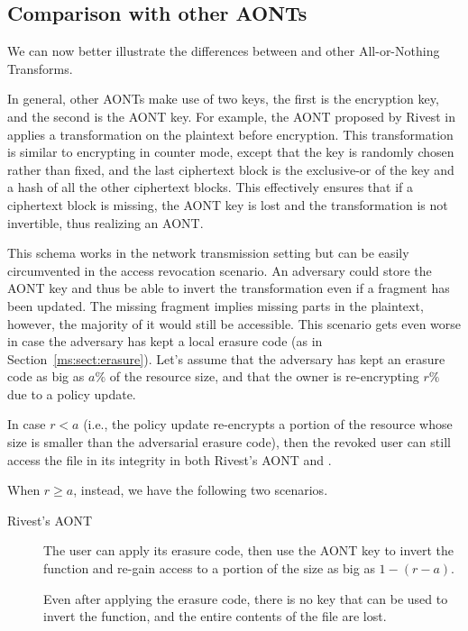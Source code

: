 {\subsection{Comparison with other AONTs}

We can now better illustrate the differences between \name and other All-or-Nothing Transforms.

In general, other AONTs make use of two keys, the first is the encryption key, and the second is the AONT key. For example, the AONT proposed by Rivest in \cite{r97} applies a transformation on the plaintext before encryption. This transformation is similar to encrypting in counter mode, except that the key is randomly chosen rather than fixed, and the last ciphertext block is the exclusive-or of the key and a hash of all the other ciphertext blocks. This effectively ensures that if a ciphertext block is missing, the AONT key is lost and the transformation is not invertible, thus realizing an AONT.

This schema works in the network transmission setting but can be easily circumvented in the access revocation scenario. An adversary could store the AONT key and thus be able to invert the transformation even if a fragment has been updated. The missing fragment implies missing parts in the plaintext, however, the majority of it would still be accessible.
This scenario gets even worse in case the adversary has kept a local erasure code (as in Section~\ref{ms:sect:erasure}). Let's assume that the adversary has kept an erasure code as big as $a\%$ of the resource size, and that the owner is re-encrypting $r\%$ due to a policy update.

In case $r < a$ (i.e., the policy update re-encrypts a portion of the resource whose size is smaller than the adversarial erasure code), then the revoked user can still access the file in its integrity in both Rivest's AONT and \name.

\noindent When $r \geq a$, instead, we have the following two scenarios.

\begin{description}
	\item [Rivest's AONT] The user can apply its erasure code, then use the AONT key to invert the function and re-gain access to a portion of the size as big as $1 - (r - a)$.
	\item [\name] Even after applying the erasure code, there is no key that can be used to invert the function, and the entire contents of the file are lost.
\end{description}

}
